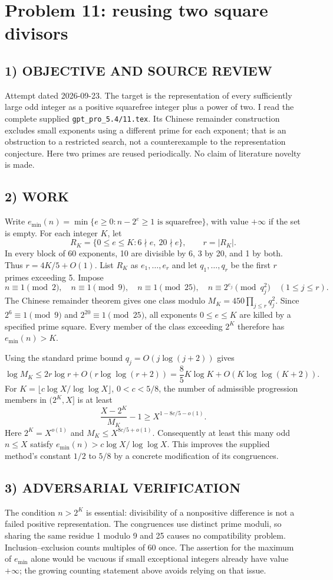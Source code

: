 \section{Problem 11: reusing two square divisors}
\subsection*{1) OBJECTIVE AND SOURCE REVIEW}
Attempt dated 2026-09-23. The target is the representation of every sufficiently large odd integer as a positive squarefree integer plus a power of two. I read the complete supplied \texttt{gpt\_pro\_5.4/11.tex}. Its Chinese remainder construction excludes small exponents using a different prime for each exponent; that is an obstruction to a restricted search, not a counterexample to the representation conjecture. Here two primes are reused periodically. No claim of literature novelty is made.
\subsection*{2) WORK}
Write $e_{\min}(n)=\min\{e\ge0:n-2^e\ge1\text{ is squarefree}\}$, with value $+\infty$ if the set is empty. For each integer $K$, let
\[
R_K=\{0\le e\le K:6\nmid e,\ 20\nmid e\},\qquad r=|R_K|.
\]
In every block of 60 exponents, 10 are divisible by 6, 3 by 20, and 1 by both. Thus $r=4K/5+O(1)$. List $R_K$ as $e_1,\ldots,e_r$ and let $q_1,\ldots,q_r$ be the first $r$ primes exceeding 5. Impose
\[
n\equiv1\pmod2,\quad n\equiv1\pmod9,\quad n\equiv1\pmod{25},\quad
n\equiv2^{e_j}\pmod{q_j^2}\quad(1\le j\le r).
\]
The Chinese remainder theorem gives one class modulo
$M_K=450\prod_{j\le r}q_j^2$. Since $2^6\equiv1\pmod9$ and $2^{20}\equiv1\pmod{25}$, all exponents $0\le e\le K$ are killed by a specified prime square. Every member of the class exceeding $2^K$ therefore has $e_{\min}(n)>K$.

Using the standard prime bound $q_j=O(j\log(j+2))$ gives
\[
\log M_K\le2r\log r+O(r\log\log(r+2))
=\frac85K\log K+O(K\log\log(K+2)).
\]
For $K=\lfloor c\log X/\log\log X\rfloor$, $0<c<5/8$, the number of admissible progression members in $(2^K,X]$ is at least
\[
\frac{X-2^K}{M_K}-1
\ge X^{1-8c/5-o(1)}.
\]
Here $2^K=X^{o(1)}$ and $M_K\le X^{8c/5+o(1)}$. Consequently at least this many odd $n\le X$ satisfy $e_{\min}(n)>c\log X/\log\log X$. This improves the supplied method's constant $1/2$ to $5/8$ by a concrete modification of its congruences.
\subsection*{3) ADVERSARIAL VERIFICATION}
The condition $n>2^K$ is essential: divisibility of a nonpositive difference is not a failed positive representation. The congruences use distinct prime moduli, so sharing the same residue 1 modulo 9 and 25 causes no compatibility problem. Inclusion--exclusion counts multiples of 60 once. The assertion for the maximum of $e_{\min}$ alone would be vacuous if small exceptional integers already have value $+\infty$; the growing counting statement above avoids relying on that issue.
